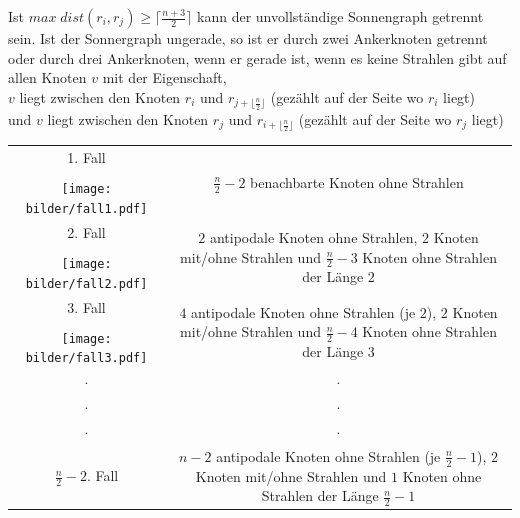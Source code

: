 \begin{lem}
\label{usg}
Ist $max\;dist(r_i,r_j)\geq \lceil \frac{n+3}{2}\rceil$ kann der unvollständige Sonnengraph getrennt sein. Ist der Sonnergraph ungerade, so ist er durch zwei Ankerknoten getrennt oder durch drei Ankerknoten, wenn er gerade ist, wenn es keine Strahlen gibt auf allen Knoten $v$ mit der Eigenschaft,\\
$v$ liegt zwischen den Knoten $r_i$ und $r_{j+\lfloor\frac{n}{2}\rfloor}$ (gezählt auf der Seite wo $r_i$ liegt) \\und $v$ liegt zwischen den Knoten $r_j$ und $r_{i+\lfloor\frac{n}{2}\rfloor}$ (gezählt auf der Seite wo $r_j$ liegt)
\end{lem}
\begin{table}[htp]
\centering
 \renewcommand{\arraystretch}{2}
\begin{tabularx}{\textwidth}{||c|c||}
\hline\hline
\vspace{0.3mm}
1. Fall& \multirow{3}{121mm}{$\frac{n}{2}-2$ benachbarte Knoten ohne Strahlen}\\
\cline{1-1}
\vspace{-6mm}
&\\
	\texttt{[image: bilder/fall1.pdf]}&\\
\hline\hline
\vspace{0.3mm}
2. Fall&\multirow{3}{121mm}{$2$ antipodale Knoten ohne Strahlen, $2$ Knoten mit/ohne Strahlen und $\frac{n}{2}-3$ Knoten ohne Strahlen der Länge $2$}\\
\cline{1-1}
\vspace{-6mm}&\\
\texttt{[image: bilder/fall2.pdf]}&\\
\hline\hline
\vspace{0.3mm}
3. Fall&\multirow{3}{121mm}{ $4$ antipodale Knoten ohne Strahlen (je $2$), $2$ Knoten mit/ohne Strahlen und $\frac{n}{2}-4$ Knoten ohne Strahlen der Länge $3$}\\
\cline{1-1}
\vspace{-6mm}&\\
\texttt{[image: bilder/fall3.pdf]}&\\
\hline\hline
$\cdot$ &  $\cdot$\\
$\cdot$ &  $\cdot$\\
$\cdot$ &  $\cdot$\\
\hline\hline
\vspace{0.3mm}
$\frac{n}{2}-2$. Fall&\multirow{3}{121mm}{$n-2$ antipodale Knoten ohne Strahlen (je $\frac{n}{2}-1$), $2$ Knoten mit/ohne Strahlen und $1$ Knoten ohne Strahlen der Länge $\frac{n}{2}-1$}\\

\end{tabularx}
\end{table}

